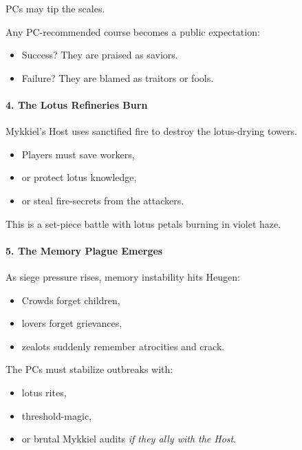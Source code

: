 \documentclass[11pt]{article}
\begin{document}
PCs may tip the scales.

\begin{tcolorbox}[title=\textbf{GM Prompt: Cost of Influence},colback=blue!5,colframe=blue!50,breakable]
Any PC-recommended course becomes a public expectation:
\begin{itemize}
  \item Success? They are praised as saviors.
  \item Failure? They are blamed as traitors or fools.
\end{itemize}
\end{tcolorbox}

\paragraph{4. The Lotus Refineries Burn}
Mykkiel's Host uses sanctified fire to destroy the lotus-drying towers.
\begin{itemize}[leftmargin=*]
  \item Players must save workers,
  \item or protect lotus knowledge,
  \item or steal fire-secrets from the attackers.
\end{itemize}

This is a set-piece battle with lotus petals burning in violet haze.

\paragraph{5. The Memory Plague Emerges}
As siege pressure rises, memory instability hits Heugen:
\begin{itemize}[leftmargin=*]
  \item Crowds forget children,
  \item lovers forget grievances,
  \item zealots suddenly remember atrocities and crack.
\end{itemize}

The PCs must stabilize outbreaks with:
\begin{itemize}[leftmargin=*]
  \item lotus rites,
  \item threshold-magic,
  \item or brutal Mykkiel audits \emph{if they ally with the Host}.
\end{itemize}

\bigskip
\end{document}

